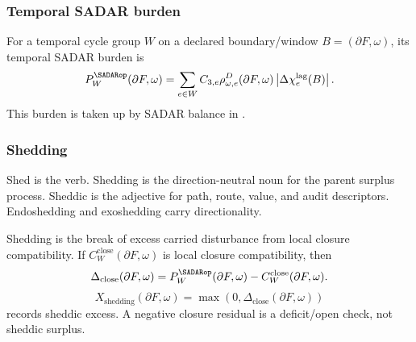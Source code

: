 \subsubsection{Temporal SADAR burden}\label{subsec:temporal-sadar-burden}
For a temporal cycle group \(W\) on a declared boundary/window \(B=(\partial F,\omega)\), its temporal SADAR burden is
\begin{equation}
P^{\SADARop}_{W}(\partial F,\omega)=
\sum_{e\in W}
C_{3,e}
\rho^D_{\omega,e}(\partial F,\omega)
\left|\Delta\chi_e^{\mathrm{lag}}(B)\right|.
\label{eq:temporal-sadar-burden}
\end{equation}
This burden is taken up by SADAR balance in .

\subsubsection{Shedding}\label{subsec:shedding}
\begin{definition}[Shedding]
Shed is the verb. Shedding is the direction-neutral noun for the parent surplus process. Sheddic is the adjective for path, route, value, and audit descriptors. Endoshedding and exoshedding carry directionality.

Shedding is the break of excess carried disturbance from local closure compatibility. If \(C^{\mathrm{close}}_W(\partial F,\omega)\) is local closure compatibility, then
\begin{equation}
\Delta_{\mathrm{close}}(\partial F,\omega)
=
P_W^{\SADARop}(\partial F,\omega)-C^{\mathrm{close}}_W(\partial F,\omega).
\label{eq:closure-residual}
\end{equation}
\begin{equation}
X_{\mathrm{shedding}}(\partial F,\omega)=
\max\!\left(0,
\Delta_{\mathrm{close}}(\partial F,\omega)
\right)
\label{eq:shedding-excess}
\end{equation}
records sheddic excess. A negative closure residual is a deficit/open check, not sheddic surplus.
\end{definition}

